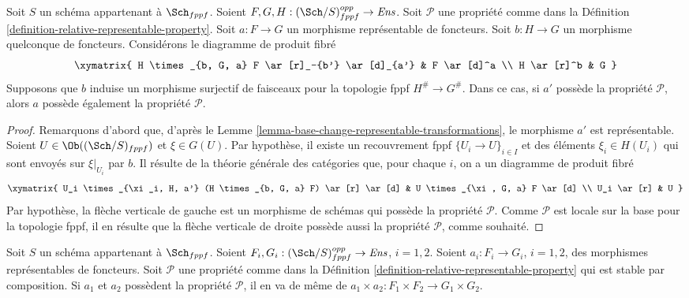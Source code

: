 \begin{lemma}
\label{lemma-descent-representable-transformations-property}
Soit $S$ un schéma appartenant à $\Sch_{fppf}$.
Soient $F, G, H : (\Sch/S)_{fppf}^{opp} \to \textit{Ens}$.
Soit $\mathcal{P}$ une propriété comme dans la
Définition \ref{definition-relative-representable-property}.
Soit $a : F \to G$ un morphisme représentable de foncteurs.
Soit $b : H \to G$ un morphisme quelconque de foncteurs.
Considérons le diagramme de produit fibré
$$
\xymatrix{
H \times_{b, G, a} F \ar[r]_-{b'} \ar[d]_{a'} & F \ar[d]^a \\
H \ar[r]^b & G
}
$$
Supposons que $b$ induise un morphisme surjectif de faisceaux pour la topologie fppf $H^\# \to G^\#$.
Dans ce cas, si $a'$ possède la propriété $\mathcal{P}$, alors $a$
possède également la propriété $\mathcal{P}$.
\end{lemma}

\begin{proof}
Remarquons d'abord que, d'après le
Lemme \ref{lemma-base-change-representable-transformations},
le morphisme $a'$ est représentable.
Soient $U \in \Ob((\Sch/S)_{fppf})$ et
$\xi \in G(U)$. Par hypothèse, il existe un recouvrement fppf
$\{U_i \to U\}_{i \in I}$ et des éléments $\xi_i \in H(U_i)$
qui sont envoyés sur $\xi|_{U_i}$ par $b$. Il résulte de la théorie générale des catégories que, pour
chaque $i$, on a un diagramme de produit fibré
$$
\xymatrix{
U_i \times_{\xi_i, H, a'} (H \times_{b, G, a} F) \ar[r] \ar[d] &
U \times_{\xi, G, a} F \ar[d] \\
U_i \ar[r] & U
}
$$
Par hypothèse, la flèche verticale de gauche est un morphisme de schémas qui
possède la propriété $\mathcal{P}$. Comme $\mathcal{P}$ est locale sur la base pour la
topologie fppf, il en résulte que la flèche verticale de droite possède aussi la propriété
$\mathcal{P}$, comme souhaité.
\end{proof}

\begin{lemma}
\label{lemma-product-representable-transformations-property}
Soit $S$ un schéma appartenant à $\Sch_{fppf}$.
Soient $F_i, G_i : (\Sch/S)_{fppf}^{opp} \to \textit{Ens}$,
$i = 1, 2$.
Soient $a_i : F_i \to G_i$, $i = 1, 2$, des morphismes représentables
de foncteurs.
Soit $\mathcal{P}$ une propriété comme dans la
Définition \ref{definition-relative-representable-property}
qui est stable par composition.
Si $a_1$ et $a_2$ possèdent la propriété $\mathcal{P}$, il en va de même de
$a_1 \times a_2 : F_1 \times F_2 \longrightarrow G_1 \times G_2$.
\end{lemma}


